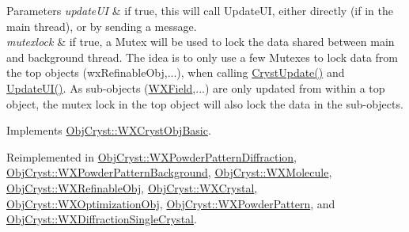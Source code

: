 \begin{DoxyParams}{Parameters}
{\em update\+UI} & if true, this will call Update\+UI, either directly (if in the main thread), or by sending a message. \\
\hline
{\em mutexlock} & if true, a Mutex will be used to lock the data shared between main and background thread. The idea is to only use a few Mutexes to lock data from the top objects (wx\+Refinable\+Obj,...), when calling \mbox{\hyperlink{class_obj_cryst_1_1_w_x_cryst_obj_a1ea28fa0a66b5163b66bf42a8d1451b3}{Cryst\+Update()}} and \mbox{\hyperlink{class_obj_cryst_1_1_w_x_cryst_obj_a6578681b14426e8a844ac6e4ca7fafea}{Update\+U\+I()}}. As sub-\/objects (\mbox{\hyperlink{class_obj_cryst_1_1_w_x_field}{W\+X\+Field}},...) are only updated from within a top object, the mutex lock in the top object will also lock the data in the sub-\/objects. \\
\hline
\end{DoxyParams}


Implements \mbox{\hyperlink{class_obj_cryst_1_1_w_x_cryst_obj_basic_a7ac00ae2ae28f1a6fa26e6fa571186b6}{Obj\+Cryst\+::\+W\+X\+Cryst\+Obj\+Basic}}.



Reimplemented in \mbox{\hyperlink{class_obj_cryst_1_1_w_x_powder_pattern_diffraction_a1da4c9c31433e1cee6bf77afca30818e}{Obj\+Cryst\+::\+W\+X\+Powder\+Pattern\+Diffraction}}, \mbox{\hyperlink{class_obj_cryst_1_1_w_x_powder_pattern_background_a88a6987f3747b2538572e91f04b8f08d}{Obj\+Cryst\+::\+W\+X\+Powder\+Pattern\+Background}}, \mbox{\hyperlink{class_obj_cryst_1_1_w_x_molecule_a19b65e2f9b5da859675278ff74f3f5e9}{Obj\+Cryst\+::\+W\+X\+Molecule}}, \mbox{\hyperlink{class_obj_cryst_1_1_w_x_refinable_obj_a8249d288e62ad1ebffeea91f77ae37a3}{Obj\+Cryst\+::\+W\+X\+Refinable\+Obj}}, \mbox{\hyperlink{class_obj_cryst_1_1_w_x_crystal_a4b48719679bb8be44eb77a45ac28f4fb}{Obj\+Cryst\+::\+W\+X\+Crystal}}, \mbox{\hyperlink{class_obj_cryst_1_1_w_x_optimization_obj_a742684b478a21cec25a74c2b39914d80}{Obj\+Cryst\+::\+W\+X\+Optimization\+Obj}}, \mbox{\hyperlink{class_obj_cryst_1_1_w_x_powder_pattern_a8bdd59548c11c11a53197c0679c258a8}{Obj\+Cryst\+::\+W\+X\+Powder\+Pattern}}, and \mbox{\hyperlink{class_obj_cryst_1_1_w_x_diffraction_single_crystal_aa66e0abac5c2e4e24ccb1c982548bd4c}{Obj\+Cryst\+::\+W\+X\+Diffraction\+Single\+Crystal}}.

